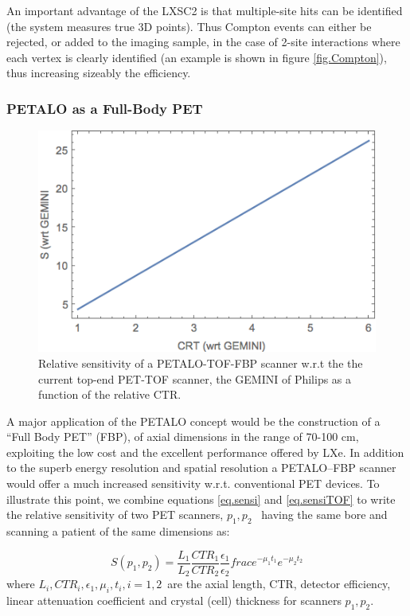 An important advantage of the LXSC2 is that multiple-site hits can be identified (the system measures true 3D points). Thus Compton events can either be rejected, or added to the imaging sample, in the case of 2-site interactions where each vertex is clearly identified (an example is shown in figure \ref{fig.Compton}), thus increasing sizeably the efficiency.  
%

\subsubsection*{PETALO as a Full-Body PET}
%
\begin{figure}[!htb]
	\centering
	\includegraphics[scale=0.8]{img/RelativeSensitivity.png}
	\caption{\label{fig.rsensi} Relative sensitivity of a PETALO-TOF-FBP scanner w.r.t the the current top-end PET-TOF scanner, the GEMINI of Philips as a function of the relative CTR.  }
\end{figure}


A major application of the PETALO concept would be the construction of a ``Full Body PET'' (FBP), of axial dimensions in the range of 70-100 cm, exploiting the low cost and the excellent performance offered by LXe. In addition to the superb energy resolution and spatial resolution a PETALO--FBP scanner would offer a much increased sensitivity w.r.t. conventional PET devices. To illustrate this point, we combine equations \ref{eq.sensi} and \ref{eq.sensiTOF} to write the relative sensitivity of two PET scanners, $p_1,p_2$~ having the same bore and scanning a patient of the same dimensions as:

\begin{equation}
S(p_1,p_2) = \frac{L_1} {L_2}\frac{CTR_1} {CTR_2}\frac{\epsilon_1} {\epsilon_2}frac{e^{-\mu_1 t_1}} {e^{-\mu_2 t_2}}
\label{eq.srel}
\end{equation}
%
where $L_i,CTR_i,\epsilon_1,\mu_i,t_i, i=1,2$~are the axial length, CTR, detector efficiency, linear attenuation coefficient and crystal (cell) thickness for scanners $p_1,p_2$.

